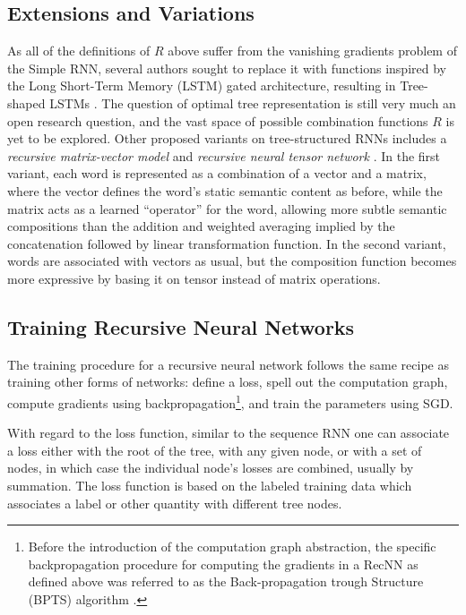 \documentclass[jair,twoside,11pt,theapa]{article}
\begin{document}
{\subsection{Extensions and Variations}
As all of the definitions of $R$ above suffer from the vanishing gradients
problem of the Simple RNN, several authors sought to replace it with functions
inspired by the Long Short-Term Memory (LSTM) gated architecture, resulting in
Tree-shaped LSTMs \cite{tai2015improved,zhu2015long}.
The question of optimal tree representation is still very much an open research
question, and the vast space of possible combination functions $R$ is yet to be
explored.
Other proposed variants on tree-structured RNNs includes a
\emph{recursive matrix-vector model} \cite{socher2012semantic}
and \emph{recursive neural tensor network} \cite{socher2013recursive}.
In the first variant, each word is
represented as a combination of a vector and a matrix, where the vector defines
the word's static semantic content as before, while the matrix acts as a learned
``operator'' for the word, allowing more subtle semantic compositions than the
addition and weighted averaging implied by the concatenation followed by linear
transformation function.  In the second variant, words are associated with
vectors as usual, but the composition
function becomes more expressive by basing it on tensor instead of matrix operations.

\subsection{Training Recursive Neural Networks}

The training procedure for a recursive neural network follows the same recipe as
training other forms of networks: define a loss, spell out the computation graph, compute
gradients using backpropagation\footnote{Before the introduction of the
computation graph abstraction, the specific backpropagation procedure for
computing the gradients in a RecNN as defined above was referred to as the
Back-propagation trough Structure (BPTS) algorithm \cite{goller1996learning}.}, and train the parameters using SGD.

With regard to the loss function, similar to the sequence RNN one can associate
a loss either with the root of the tree, with any given node, or with a set of
nodes, in which case the individual node's losses are combined, usually by
summation. The loss function is based on the labeled training data which
associates a label or other quantity with different tree nodes.

}
\end{document}
